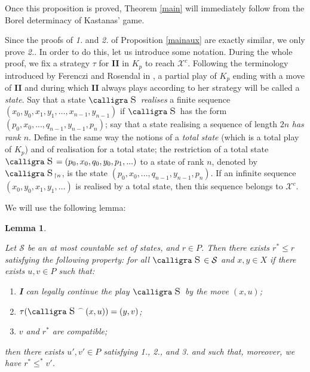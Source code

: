 \documentclass[a4paper,11pt]{article}
\newtheorem{lem}[thm]{Lemma}
\theoremstyle{definition}
\numberwithin{equation}{section}
\newcommand{\X}{\mathcal{X}}
\newcommand{\St}{\mathcal{S}}
\newcommand{\I}{\textbf{I}}
\newcommand{\II}{\textbf{II}}
\newcommand{\st}{\text{{\calligra \LARGE s}}\,}
\newcommand{\concat}{%
  \mathbin{\raisebox{1ex}{\scalebox{.7}{$\frown$}}}%
}
\begin{document}
Once this proposition is proved, Theorem \ref{main} will immediately follow from the Borel determinacy of Kastanas' game.

\smallskip

Since the proofs of \emph{1.} and \emph{2.} of Proposition \ref{mainaux} are exactly similar, we only prove \emph{2.}. In order to do this, let us introduce some notation. During the whole proof, we fix a strategy $\tau$ for \II{} in $K_p$ to reach $\X^c$. Following the terminology introduced by Ferenczi and Rosendal in \cite{fero}, a partial play of $K_p$ ending with a move of \II{} and during which \II{} always plays according to her strategy will be called a \emph{state}. Say that a state $\st$ \emph{realises} a finite sequence $(x_0, y_0, x_1, y_1, \ldots, x_{n - 1}, y_{n - 1})$ if $\st$ has the form $(p_0, x_0, ..., q_{n - 1}, y_{n - 1}, p_n)$; say that a state realising a sequence of length $2n$ \emph{has rank $n$}. Define in the same way the notions of a \emph{total state} (which is a total play of $K_p$) and of realisation for a total state; the restriction of a total state $\st =  (p_0, x_0, q_0, y_0, p_1, ...)$ to a state of rank $n$, denoted by $\st_{\restriction n}$, is the state $(p_0, x_0, ..., q_{n - 1}, y_{n - 1}, p_n)$. If an infinite sequence $(x_0, y_0, x_1, y_1, \ldots)$ is realised by a total state, then this sequence belongs to $\X^c$.

\smallskip

We will use the following lemma:

\begin{lem}\label{mainlem}

Let $\St$ be an at most countable set of states, and $r \in P$. Then there exists $r^* \leqslant r$ satisfying the following property: for all $\st \in \St$ and $x, y \in X$ if there exists $u, v \in P$ such that:

\begin{enumerate}

\item \I{} can legally continue the play $\st$ by the move $(x, u)$;

\item $\tau(\st \concat (x, u)) = (y, v)$;

\item $v$ and $r^*$ are compatible;

\end{enumerate}

\noindent then there exists $u', v' \in P$ satisfying \emph{1.}, \emph{2.}, and \emph{3.} and such that, moreover, we have $r^* \leqslant^* v'$.

\end{lem}
\end{document}
